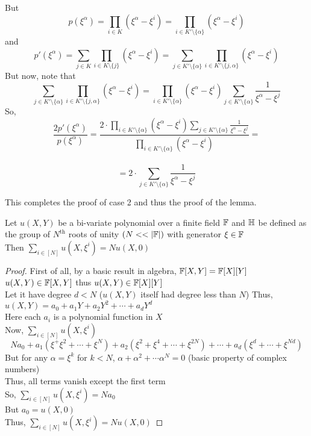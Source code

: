 But $$p(\xi^{\alpha})=\prod_{i \in K}(\xi^{\alpha}-\xi^i)=\prod_{i \in K'\setminus \{\alpha\}}(\xi^{\alpha}-\xi^i)$$ and $$p'(\xi^{\alpha})=\sum_{j \in K} \prod_{i \in K \setminus \{j\}}(\xi^{\alpha}-\xi^i)=\sum_{j \in K'\setminus \{\alpha\}} \prod_{i \in K' \setminus \{j, \alpha\}}(\xi^{\alpha}-\xi^i)$$
But now, note that $$\sum_{j \in K'\setminus \{\alpha\}} \prod_{i \in K' \setminus \{j, \alpha\}}(\xi^{\alpha}-\xi^i)=\prod_{i \in K' \setminus \{ \alpha\}}(\xi^{\alpha}-\xi^i)\sum_{j \in K'\setminus \{\alpha\}}\frac{1}{\xi^{\alpha}-\xi^j}$$
So, $$\frac{2p'(\xi^{\alpha})}{p(\xi^{\alpha})}=\frac{2\cdot \prod_{i \in K' \setminus \{ \alpha\}}(\xi^{\alpha}-\xi^i)\sum_{j \in K'\setminus \{\alpha\}}\frac{1}{\xi^{\alpha}-\xi^j}}{\prod_{i \in K'\setminus \{\alpha\}}(\xi^{\alpha}-\xi^i)}=$$\\
$$=2\cdot\sum_{j \in K'\setminus \{\alpha\}}\frac{1}{\xi^{\alpha}-\xi^j}$$

This completes the proof of case 2 and thus the proof of the lemma.

\begin{lemma}[Sumcheck]\label{lem:sumcheck}
Let $u(X,Y)$ be a bi-variate polynomial over a finite field $\mathbb{F}$ and $\mathbb{H}$ be defined as the group of $N^{\text{th}}$ roots of unity $(N<<|\F|)$ with generator $\xi \in \mathbb{F}$ \\
Then $\sum_{i\in [N]}u(X,\xi^i)= Nu(X,0)$
\end{lemma}

\begin{proof}
    First of all, by a basic result in algebra, $\mathbb{F}[X,Y]=\mathbb{F}[X][Y]$\\
    $u(X,Y) \in \mathbb{F}[X,Y]$ thus $u(X,Y) \in \mathbb{F}[X][Y]$\\
    Let it have degree $d<N$ ($u(X,Y)$ itself had degree less than $N$)
    Thus, $u(X,Y)=a_0+a_1 Y+ a_2 Y^2+\cdots+ a_d Y^d$\\
    Here each $a_i$ is a polynomial function in $X$\\
    Now,  $\sum_{i\in [N]}u(X,\xi^i)$
    $$N a_0+a_1(\xi^+\xi^2+\cdots+\xi^N)+a_2(\xi^2+\xi^4+\cdots+\xi^{2N})+ \cdots + a_d(\xi^d+\cdots +\xi^{Nd})$$
    But for any $\alpha=\xi^k$ for $k<N$, $\alpha+\alpha^2+\cdots \alpha^N=0$ (basic property of complex numbers)\\
    Thus, all terms vanish except the first term\\
    So, $\sum_{i\in [N]}u(X,\xi^i)=N a_0$\\
    But $a_0=u(X, 0)$\\
    Thus, $\sum_{i\in [N]}u(X,\xi^i)=N u(X, 0)$
\end{proof}


